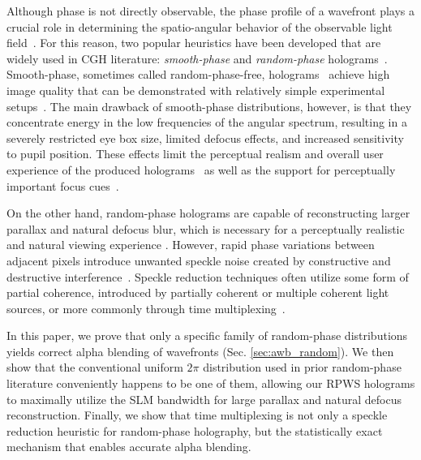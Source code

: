 Although phase is not directly observable, the phase profile of a wavefront plays a crucial role in determining the spatio-angular behavior of the observable light field~\cite{st1995phase, schiffers2023stochastic, kim2022accommodative, Chakravarthula2022pupil}. For this reason, two popular heuristics have been developed that are widely used in  CGH literature: \textit{smooth-phase} and \textit{random-phase} holograms~\cite{maimone2017holographic, yoo2021optimization}. Smooth-phase, sometimes called random-phase-free, holograms~\cite{shimobaba2015random} achieve high image quality that can be demonstrated with relatively simple experimental setups~\cite{maimone2017holographic, shi2021towards, peng2020neural, choi2025gaussian}. The main drawback of smooth-phase distributions, however, is that they concentrate energy in the low frequencies of the angular spectrum, resulting in a severely restricted eye box size, limited defocus effects, and increased sensitivity to pupil position. These effects limit the perceptual realism and overall user experience of the produced holograms~\cite{kim2024holographic} as well as the support for perceptually important focus cues~\cite{kim2022accommodative}.

On the other hand, random-phase holograms are capable of reconstructing larger parallax and natural defocus blur, which is necessary for a perceptually realistic and natural viewing experience \cite{kim2024holographic}. However, rapid phase variations between adjacent pixels introduce unwanted speckle noise created by constructive and destructive interference~\cite{goodman2007speckle}. Speckle reduction techniques often utilize some form of partial coherence, introduced by partially coherent or multiple coherent light sources, or more commonly through time multiplexing~\cite{lee2020light, chao2024large, kuo2023multisource, choi2022time, curtis2021dcgh, peng2021speckle}. 

In this paper, we prove that only a specific family of random-phase distributions yields correct alpha blending of wavefronts (Sec. \ref{sec:awb_random}). We then show that the conventional uniform $2\pi$ distribution used in prior random-phase literature conveniently happens to be one of them, allowing our RPWS holograms to maximally utilize the SLM bandwidth for large parallax and natural defocus reconstruction. Finally, we show that time multiplexing is not only a speckle reduction heuristic for random-phase holography, but the statistically exact mechanism that enables accurate alpha blending.



